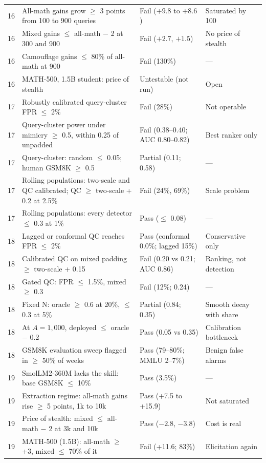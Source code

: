 \begin{longtable}{p{}p{}p{}p{}}
16 & All-math gains grow $\ge$ 3 points from 100 to 900 queries & Fail ($+9.8$ to $+8.6$) & Saturated by 100 \\
16 & Mixed gains $\le$ all-math $-$ 2 at 300 and 900 & Fail ($+2.7$, $+1.5$) & No price of stealth \\
16 & Camouflage gains $\le$ 80\% of all-math at 900 & Fail (130\%) & --- \\
16 & MATH-500, 1.5B student: price of stealth & Untestable (not run) & Open \\
17 & Robustly calibrated query-cluster FPR $\le$ 2\% & Fail (28\%) & Not operable \\
17 & Query-cluster power under mimicry $\ge$ 0.5, within 0.25 of unpadded & Fail (0.38--0.40; AUC 0.80--0.82) & Best ranker only \\
17 & Query-cluster: random $\le$ 0.05; human GSM8K $\ge$ 0.5 & Partial (0.11; 0.58) & --- \\
17 & Rolling populations: two-scale and QC calibrated; QC $\ge$ two-scale + 0.2 at 2.5\% & Fail (24\%, 69\%) & Scale problem \\
17 & Rolling populations: every detector $\le$ 0.3 at 1\% & Pass ($\le$ 0.08) & --- \\
18 & Lagged or conformal QC reaches FPR $\le$ 2\% & Pass (conformal 0.0\%; lagged 15\%) & Conservative only \\
18 & Calibrated QC on mixed padding $\ge$ two-scale + 0.15 & Fail (0.20 vs 0.21; AUC 0.86) & Ranking, not detection \\
18 & Gated QC: FPR $\le$ 1.5\%, mixed $\ge$ 0.3 & Fail (12\%; 0.24) & --- \\
18 & Fixed N: oracle $\ge$ 0.6 at 20\%, $\le$ 0.3 at 5\% & Partial (0.84; 0.35) & Smooth decay with share \\
18 & At $A=1{,}000$, deployed $\le$ oracle $-$ 0.2 & Pass (0.05 vs 0.35) & Calibration bottleneck \\
18 & GSM8K evaluation sweep flagged in $\ge$ 50\% of weeks & Pass (79--80\%; MMLU 2--7\%) & Benign false alarms \\
19 & SmolLM2-360M lacks the skill: base GSM8K $\le$ 10\% & Pass (3.5\%) & --- \\
19 & Extraction regime: all-math gains rise $\ge$ 5 points, 1k to 10k & Pass (+7.5 to +15.9) & Not saturated \\
19 & Price of stealth: mixed $\le$ all-math $-$ 2 at 3k and 10k & Pass ($-2.8$, $-3.8$) & Cost is real \\
19 & MATH-500 (1.5B): all-math $\ge$ +3, mixed $\le$ 70\% of it & Fail (+11.6; 83\%) & Elicitation again \\

\end{longtable}
